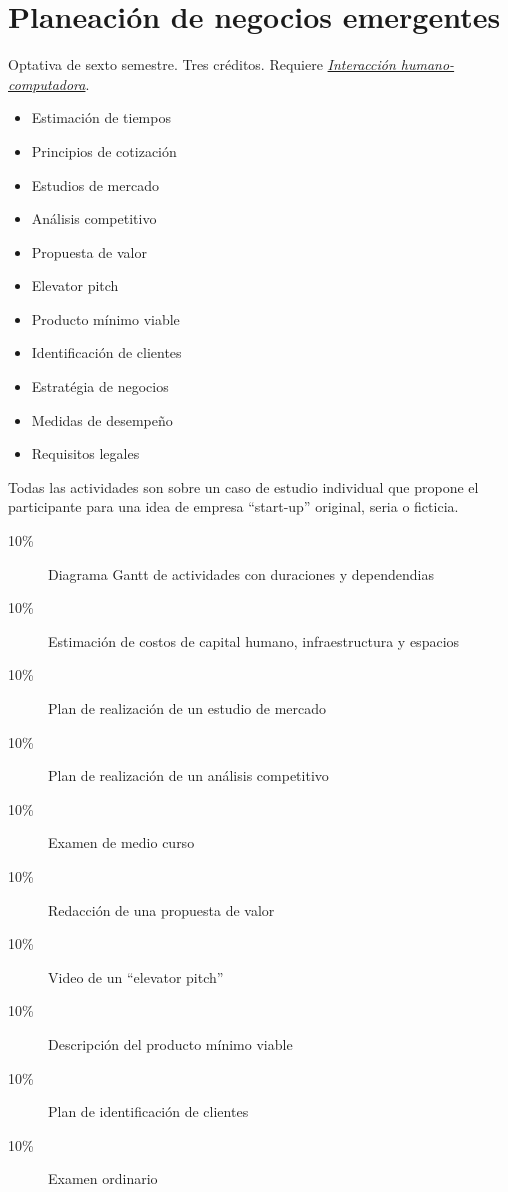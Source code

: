 \documentclass{article}
\begin{document}
\begin{multicols}{4}
\newpage

\hypertarget{pdne}{\section*{Planeaci\'{o}n de negocios emergentes}}

Optativa de sexto semestre. Tres cr\'{e}ditos. Requiere
\hyperlink{ihc}{\em Interacci\'{o}n humano-computadora}.

\begin{itemize}
\item{Estimaci\'{o}n de tiempos}
\item{Principios de cotizaci\'{o}n}  
\item{Estudios de mercado}
\item{An\'{a}lisis competitivo}
\item{Propuesta de valor}
\item{Elevator pitch}
\item{Producto m\'{i}nimo viable}
\item{Identificaci\'{o}n de clientes}
\item{Estrat\'{e}gia de negocios}
\item{Medidas de desempe\~{n}o}
\item{Requisitos legales}
\end{itemize}

Todas las actividades son sobre un caso de estudio individual que
propone el participante para una idea de empresa ``start-up''
original, seria o ficticia.

\begin{description}
\item[10\%]{Diagrama Gantt de actividades con duraciones y
  dependendias}
\item[10\%]{Estimaci\'{o}n de costos de capital humano, infraestructura y
  espacios}
\item[10\%]{Plan de realizaci\'{o}n de un estudio de mercado}
\item[10\%]{Plan de realizaci\'{o}n de un an\'{a}lisis competitivo}  
\item[10\%]{Examen de medio curso}  
\item[10\%]{Redacci\'{o}n de una propuesta de valor}
\item[10\%]{Video de un ``elevator pitch''}
\item[10\%]{Descripci\'{o}n del producto m\'{i}nimo viable}  
\item[10\%]{Plan de identificaci\'{o}n de clientes}
\item[10\%]{Examen ordinario}
\end{description}  


\end{multicols}
\end{document}
